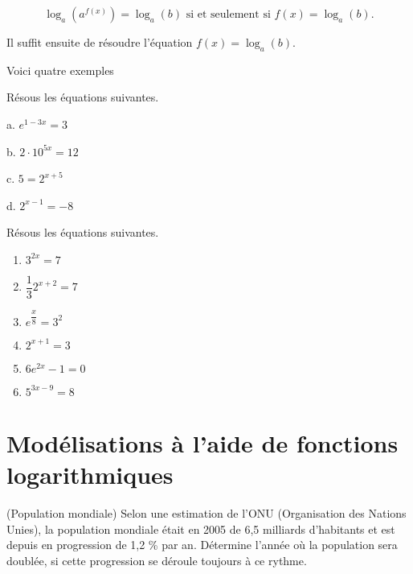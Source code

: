 \documentclass[a4paper,12pt,singlepage]{report}
\begin{document}
\[
\log_a(a^{f(x)})=\log_a(b) \text{ si et seulement si } f(x)=\log_a(b).
\]

Il suffit ensuite de résoudre l'équation \(f(x)=\log_a(b)\).

Voici quatre exemples

\begin{exemple}
Résous les équations suivantes.

a. \(e^{1-3x}=3\)

\vspace{3cm}

b. \(2\cdot 10^{5x}=12\)

\vspace{3cm}

c. \(5=2^{x+5}\)

\vspace{3cm}

d. \(2^{x-1}=-8\)
   \vspace{2cm}
\end{exemple}

\begin{exercice}
Résous les équations suivantes.

\par \setlength{\columnseprule}{0 pt}
          \begin{minipage}[t]{\linewidth}
          \begin{multicols}{3}

\begin{enumerate}
\item \(3^{2x}=7\)

\item \(\dfrac{1}{3} 2^{x+2}=7\)

\item \(e^{\dfrac{x}{8}}=3^2\)

\item \(2^{x+1}=3\)

\item \(6e^{2x}-1=0\)

\item \(5^{3x-9}=8\)
\end{enumerate}



\end{multicols}\end{minipage}
\end{exercice}
\section{Modélisations à l'aide de fonctions logarithmiques}
\label{sec:orge0ec71f}
\begin{exercice}
(Population mondiale) Selon une estimation de l’ONU (Organisation des Nations Unies), la population
mondiale était en 2005 de 6,5 milliards d’habitants et est depuis en progression de
1,2 \% par an.
Détermine l’année où la population sera doublée, si cette progression se déroule
toujours à ce rythme.
\end{exercice}
\end{document}
